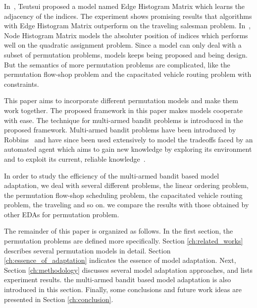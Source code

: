 In~\citep{tsutsui2002probabilistic}, Tsutsui proposed a model named Edge Histogram Matrix which learns the adjacency of the indices. The experiment shows promising results that algorithms with Edge Histogram Matrix outperform on the traveling salesman problem. In~\citep{tsutsui2006node}, Node Histogram Matrix models the absoluter position of indices which performs well on the quadratic assignment problem. Since a model can only deal with a subset of permutation problems, models keeps being proposed and being design. But the semantics of more permutation problems are complicated, like the permutation flow-shop problem and the capacitated vehicle routing problem with constraints.
 
This paper aims to incorporate different permutation models and make them work together. The proposed framework in this paper makes models cooperate with ease. The technique for multi-armed bandit problems is introduced in the proposed framework. Multi-armed bandit problems have been introduced by Robbins~\citep{robbins1985some} and have since been used extensively to model the tradeoffs faced by an automated agent which aims to gain new knowledge by exploring its environment and to exploit its current, reliable knowledge~\citep{robbins1985some, Kuleshov2000, Mohri2005}.

In order to study the efficiency of the multi-armed bandit based model adaptation, we deal with several different problems, the linear ordering problem, the permutation flow-shop scheduling problem, the capacitated vehicle routing problem, the traveling and so on. we compare the results with those obtained by other EDAs for permutation problem.

The remainder of this paper is organized as follows. In the first section, the permutation problems are defined more specifically. Section \ref{ch:related_works} describes several permutation models in detail. Section \ref{ch:essence_of_adaptation} indicates the essence of model adaptation. Next, Section \ref{ch:methodology} discusses several model adaptation approaches, and lists experiment results. the multi-armed bandit based model adaptation is also introduced in this section. Finally, some conclusions and future work ideas are presented in Section \ref{ch:conclusion}.
